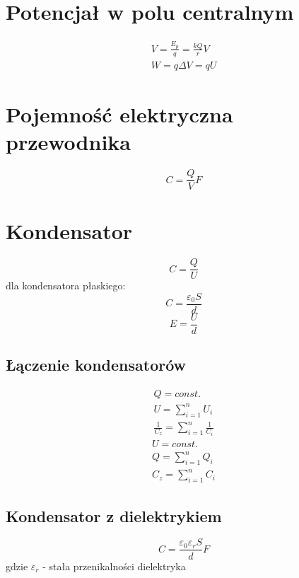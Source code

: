     \section{Potencjał w polu centralnym}
      \begin{gather}
        V = \frac{E_p}{q} = \frac{kQ}{r} \unit{V}\\
        W = q\Delta V = qU
      \end{gather}
    \section{Pojemność elektryczna przewodnika}
      \begin{equation}
        C = \frac{Q}{V} \unit{F}
      \end{equation}
    \section{Kondensator}
      \begin{equation}
        C= \frac{Q}{U}
      \end{equation}
      dla kondensatora płaskiego:
      \begin{equation}
        C= \frac{\varepsilon_0S}{d}
      \end{equation}
      \begin{equation}
        E = \frac{U}{d}
      \end{equation}
      \subsection{Łączenie kondensatorów}
        \begin{gather}
          Q = const.\\
          U = \sum_{i=1}^n U_i\\
          \frac{1}{C_z} = \sum_{i=1}^n \frac{1}{C_i}
        \end{gather}
        \begin{gather}
          U = const.\\
          Q = \sum_{i=1}^n Q_i\\
          C_z = \sum_{i=1}^n C_i
        \end{gather}
      \subsection{Kondensator z dielektrykiem}
      \begin{equation}
        C= \frac{\varepsilon_0\varepsilon_rS}{d} \unit{F}
      \end{equation}
      gdzie $\varepsilon_r$ - stała przenikalności dielektryka
